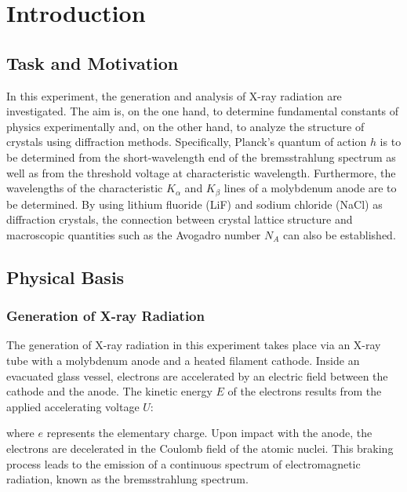 \chapter{Introduction} \label{ch:Einleitung}

\section{Task and Motivation}
\label{sec:AuM}
In this experiment, the generation and analysis of X-ray radiation are investigated. The aim is, on the one hand, to determine fundamental constants of physics experimentally and, on the other hand, to analyze the structure of crystals using diffraction methods. Specifically, Planck's quantum of action $h$ is to be determined from the short-wavelength end of the bremsstrahlung spectrum as well as from the threshold voltage at characteristic wavelength. Furthermore, the wavelengths of the characteristic $K_\alpha$ and $K_\beta$ lines of a molybdenum anode are to be determined. By using lithium fluoride (LiF) and sodium chloride (NaCl) as diffraction crystals, the connection between crystal lattice structure and macroscopic quantities such as the Avogadro number $N_A$ can also be established.

\section{Physical Basis}
\label{sec:PhyBasics}

\subsection{Generation of X-ray Radiation}
The generation of X-ray radiation in this experiment takes place via an X-ray tube with a molybdenum anode and a heated filament cathode. Inside an evacuated glass vessel, electrons are accelerated by an electric field between the cathode and the anode. The kinetic energy $E$ of the electrons results from the applied accelerating voltage $U$:

where $e$ represents the elementary charge. 
Upon impact with the anode, the electrons are decelerated in the Coulomb field of the atomic nuclei. This braking process leads to the emission of a continuous spectrum of electromagnetic radiation, known as the bremsstrahlung spectrum.

